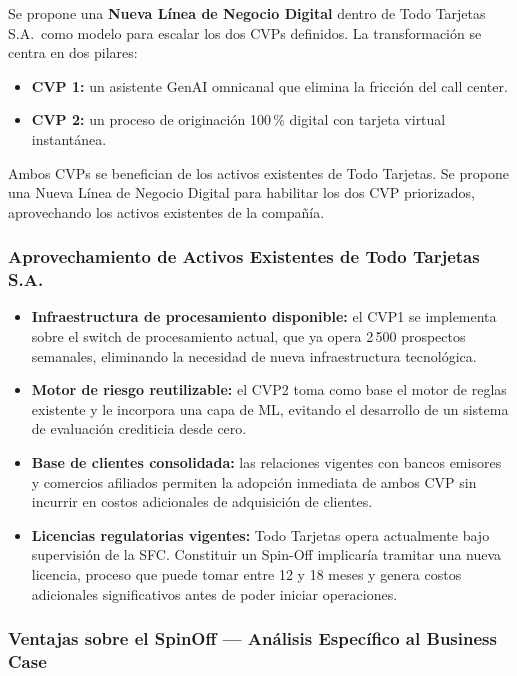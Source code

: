 \documentclass[12pt,letterpaper]{article}
\begin{document}
Se propone una \textbf{Nueva Línea de Negocio Digital} dentro de Todo Tarjetas S.A.\ como
modelo para escalar los dos CVPs definidos. La transformación se centra en dos pilares:

\begin{itemize}
  \item \textbf{CVP 1:} un asistente GenAI omnicanal que elimina la fricción del call center.
  \item \textbf{CVP 2:} un proceso de originación 100\,\% digital con tarjeta virtual instantánea.
\end{itemize}

Ambos CVPs se benefician de los activos existentes de Todo Tarjetas. Se propone una Nueva
Línea de Negocio Digital para habilitar los dos CVP priorizados, aprovechando los activos
existentes de la compañía.

\subsubsection*{Aprovechamiento de Activos Existentes de Todo Tarjetas S.A.}

\begin{itemize}
  \item \textbf{Infraestructura de procesamiento disponible:} el CVP1 se implementa sobre el
    switch de procesamiento actual, que ya opera 2\,500 prospectos semanales, eliminando la
    necesidad de nueva infraestructura tecnológica.
  \item \textbf{Motor de riesgo reutilizable:} el CVP2 toma como base el motor de reglas
    existente y le incorpora una capa de ML, evitando el desarrollo de un sistema de evaluación
    crediticia desde cero.
  \item \textbf{Base de clientes consolidada:} las relaciones vigentes con bancos emisores y
    comercios afiliados permiten la adopción inmediata de ambos CVP sin incurrir en costos
    adicionales de adquisición de clientes.
  \item \textbf{Licencias regulatorias vigentes:} Todo Tarjetas opera actualmente bajo
    supervisión de la SFC. Constituir un Spin-Off implicaría tramitar una nueva licencia,
    proceso que puede tomar entre 12 y 18 meses y genera costos adicionales significativos
    antes de poder iniciar operaciones.
\end{itemize}

\subsubsection*{Ventajas sobre el SpinOff — Análisis Específico al Business Case}
\end{document}
